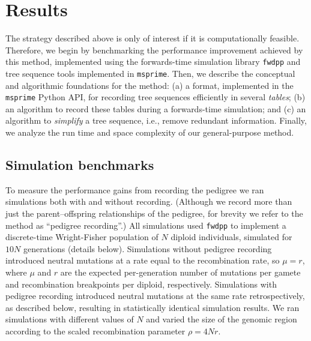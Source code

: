 \documentclass{article}
\newcommand{\fwdpp}{\texttt{fwdpp}}
\newcommand{\msprime}{\texttt{msprime}}
\begin{document}
\section*{Results}


The strategy described above is only of interest if it is computationally feasible.
Therefore,
we begin by benchmarking the performance improvement achieved by this method,
implemented using the forwards-time simulation library \fwdpp{} \citep{fwdpp}
and tree sequence tools implemented in \msprime{}.
Then, we describe the conceptual and algorithmic foundations for the method:
(a) a format, implemented in the \msprime{} Python API,
for recording tree sequences efficiently in several \emph{tables};
(b) an algorithm to record these tables during a forwards-time simulation;
and (c) an algorithm to \emph{simplify} a tree sequence, i.e., remove redundant information.
Finally, we analyze the run time and space complexity of our general-purpose method.


\subsection*{Simulation benchmarks}

To measure the performance gains from recording the pedigree we ran simulations
both with and without recording.
(Although we record more than just the parent--offspring relationships of the pedigree,
for brevity we refer to the method as ``pedigree recording''.)
All simulations used \fwdpp{} to implement a discrete-time Wright-Fisher population of $N$ diploid individuals,
simulated for $10N$ generations (details below).
Simulations without pedigree recording introduced neutral mutations at a rate
equal to the recombination rate,
so $\mu = r$, where $\mu$ and $r$ are the expected per-generation number of mutations per gamete
and recombination breakpoints per diploid, respectively.
Simulations with pedigree recording introduced neutral mutations at the same rate
retrospectively, as described below, resulting in statistically identical simulation results.
We ran simulations with different values of $N$ and varied the size of the genomic region according to the scaled recombination
parameter $\rho = 4Nr$.
\end{document}
